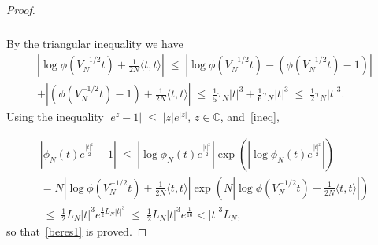 \documentclass[10pt,a4paper]{article}
\renewcommand{\leq}{\;\leqslant\;}
\newcommand{\scalar}[2]{\langle #1, #2\rangle}
\newcommand{\bbC}{\mathbb{C}}
\begin{document}
\begin{proof}
\begin{multline}
\begin{aligned}
\end{aligned}
\end{multline}
By the triangular inequality we have
\begin{multline}
\left|\log\phi\left(V_N^{-1/2}t\right)+\frac{1}{2N}\scalar{t}{t}\right| \leq \left|\log\phi\left(V_N^{-1/2}t\right) - \left(\phi\left(V_N^{-1/2}t\right)-1\right)\right|\\
+\left|\left(\phi\left(V_N^{-1/2}t\right)-1\right)+\frac{1}{2N}\scalar{t}{t}\right| \leq \frac{1}{5}\tau_N|t|^3 + \frac{1}{6}\tau_N|t|^3 \leq \frac{1}{2}\tau_N|t|^3.
\end{multline}
Using the inequality $|e^z-1|\leq |z|e^{|z|}$, $z \in \bbC$, and~\eqref{ineq},

\begin{multline}
\left|\phi_N(t)e^{\frac{|t|^2}{2}}-1\right| \leq\left|\log \phi_N(t)e^{\frac{|t|^2}{2}}\right|\exp\left(\left|\log \phi_N(t)e^{\frac{|t|^2}{2}}\right|\right) \\
=N\left|\log \phi\left(V_N^{-1/2}t\right)+\frac{1}{2N}\scalar{t}{t}\right|\exp\left(N\left|\log \phi\left(V_N^{-1/2}t\right)+\frac{1}{2N}\scalar{t}{t}\right|
\right) \\
\leq \frac{1}{2}L_N|t|^3e^{\frac{1}{2}L_N|t|^3}
\leq \frac{1}{2}L_N|t|^3e^{\frac{1}{16}} <|t|^3L_N,
\end{multline}
so that~\eqref{beres1} is proved.
\end{proof}
\end{document}
